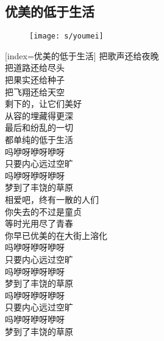 
	

\subsection{优美的低于生活}

\begin{figure}[htp]
	\begin{center}
	  \texttt{[image: s/youmei]}
	  \label{fig:youmei}
	\end{center}
\end{figure}

\begin{songs}{}
  [index={优美的低于生活}]
	把歌声还给夜晚	\\
	把道路还给尽头	\\
	把果实还给种子	\\
	把飞翔还给天空	\\
	剩下的，让它们美好	\\
	从容的埋藏得更深	\\
	最后和纷乱的一切	\\
	都单纯的低于生活	\\
	吗咿呀咿呀咿呀	\\
	只要内心远过空旷	\\
	吗咿呀咿呀咿呀	\\
	梦到了丰饶的草原	\\
	\vspace{2ex}
	相爱吧，终有一散的人们	\\
	你失去的不过是童贞	\\
	等时光用尽了青春	\\
	你早已优美的在大街上溶化	\\
	吗咿呀咿呀咿呀	\\
	只要内心远过空旷	\\
	吗咿呀咿呀咿呀	\\
	梦到了丰饶的草原	\\
	\vspace{2ex}
	吗咿呀咿呀咿呀	\\
	只要内心远过空旷	\\
	吗咿呀咿呀咿呀	\\
	梦到了丰饶的草原	\\
  \endsong


\end{songs}
